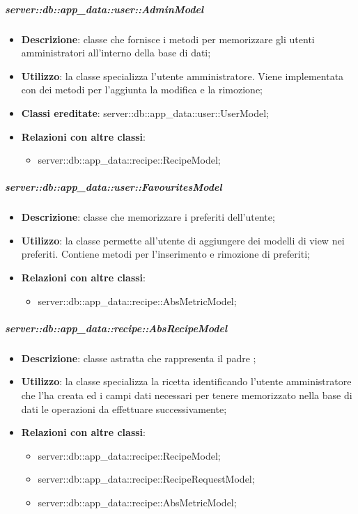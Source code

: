 		\subparagraph{server::db::app\_data::user::AdminModel} %
		\label{subp:server_db_app_data_user_admin_model}
			\begin{itemize}
				\item \textbf{Descrizione}: classe che fornisce i metodi per memorizzare gli utenti amministratori all'interno della base di dati;
				\item \textbf{Utilizzo}: la classe specializza l'utente amministratore. Viene implementata con dei metodi per l'aggiunta la modifica e la rimozione;
				\item \textbf{Classi ereditate}: server::db::app\_data::user::UserModel;
				\item \textbf{Relazioni con altre classi}:
					\begin{itemize}
						\item server::db::app\_data::recipe::RecipeModel;
					\end{itemize}
			\end{itemize}


		\subparagraph{server::db::app\_data::user::FavouritesModel} %
		\label{subp:server_db_app_data_user_favorites}
			\begin{itemize}
				\item \textbf{Descrizione}: classe che memorizzare i preferiti dell'utente;
				\item \textbf{Utilizzo}: la classe  permette all'utente di aggiungere dei modelli di view nei preferiti. Contiene metodi per l'inserimento e rimozione di preferiti;
				\item \textbf{Relazioni con altre classi}:
					\begin{itemize}
						\item server::db::app\_data::recipe::AbsMetricModel;
					\end{itemize}
			\end{itemize}


		\subparagraph{server::db::app\_data::recipe::AbsRecipeModel} %
		\label{subp:server_db_app_data_recipe_absrecipemodel}
			\begin{itemize}
				\item \textbf{Descrizione}: classe astratta che rappresenta il padre ;
				\item \textbf{Utilizzo}: la classe specializza la ricetta identificando l'utente amministratore che l'ha creata ed i campi dati necessari per tenere memorizzato nella base di dati le operazioni da effettuare successivamente;
				\item \textbf{Relazioni con altre classi}:
					\begin{itemize}
						\item server::db::app\_data::recipe::RecipeModel;
						\item server::db::app\_data::recipe::RecipeRequestModel;
						\item server::db::app\_data::recipe::AbsMetricModel;
					\end{itemize}
			\end{itemize}


